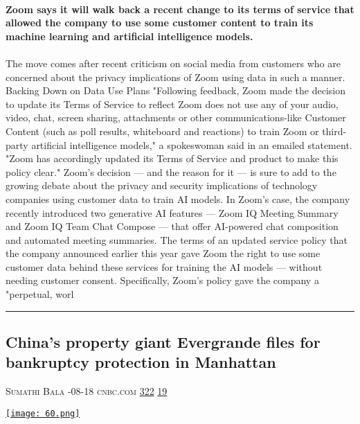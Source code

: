 \documentclass[10pt,a4paper]{article}
\begin{document}
\begin{multicols*}{2}
\paragraph{}
\textbf{Zoom says it will walk back a recent change to its terms of service that allowed the company to use some customer content to train its machine learning and artificial intelligence models.}
\paragraph{}

The move comes after recent criticism on social media from customers who are concerned about the privacy implications of Zoom using data in such a manner.
Backing Down on Data Use Plans
"Following feedback, Zoom made the decision to update its Terms of Service to reflect Zoom does not use any of your audio, video, chat, screen sharing, attachments or other communications-like Customer Content (such as poll results, whiteboard and reactions) to train Zoom or third-party artificial intelligence models," a spokeswoman said in an emailed statement. "Zoom has accordingly updated its Terms of Service and product to make this policy clear."
Zoom's decision — and the reason for it — is sure to add to the growing debate about the privacy and security implications of technology companies using customer data to train AI models.
In Zoom's case, the company recently introduced two generative AI features — Zoom IQ Meeting Summary and Zoom IQ Team Chat Compose — that offer AI-powered chat composition and automated meeting summaries. The terms of an updated service policy that the company announced earlier this year gave Zoom the right to use some customer data behind these services for training the AI models — without needing customer consent.
Specifically, Zoom's policy gave the company a "perpetual, worl
\par\noindent\textcolor{red}{\rule{\linewidth}{0.2mm}}
\vfill
\null
\noindent\begin{minipage}{\linewidth}
\subsection{China’s property giant Evergrande files for bankruptcy protection in Manhattan}
\textsc{\footnotesize
{\scriptsize\faUser}\space 
Sumathi Bala 
{\scriptsize\faCalendar}-08-18 
{\scriptsize\faGlobe}\space 
cnbc.com 
{\scriptsize\faThumbsOUp}\space 
\href{http://news.ycombinator.com/item?id=37171187\&utm\_term=comment}{322} 
{\scriptsize\faComments}\space 
\href{http://news.ycombinator.com/item?id=37171187\&utm\_term=comment}{19} 
}
\par\medskip\noindent
\href{https://www.cnbc.com/2023/08/18/china-property-developer-evergrande-files-for-bankruptcy-protection-in-us.html?utm\_source=hackernewsletter\&utm\_medium=email\&utm\_term=startup\_news}{
    \texttt{[image: 60.png]}
}
\end{minipage}

\end{multicols*}
\end{document}
